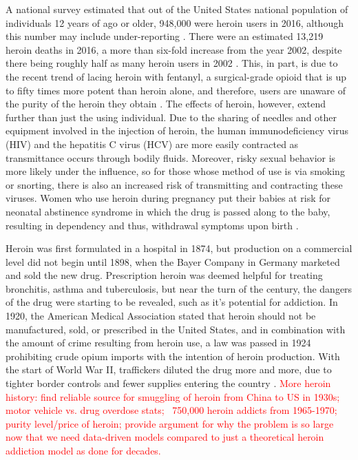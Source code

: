 \documentclass[12pt]{article}
\begin{document}
A national survey estimated that out of the United States national population of individuals 12 years of ago or older, 948,000 were heroin users in 2016, although this number may include under-reporting \cite{CDC2}. There were an estimated 13,219 heroin deaths in 2016, a more than six-fold increase from the year 2002, despite there being roughly half as many heroin users in 2002 \cite{NSDUH1}. This, in part, is due to the recent trend of lacing heroin with fentanyl, a surgical-grade opioid that is up to fifty times more potent than heroin alone, and therefore, users are unaware of the purity of the heroin they obtain \cite{CDC1, NIH2, Volkow2}. The effects of heroin, however, extend further than just the using individual. Due to the sharing of needles and other equipment involved in the injection of heroin, the human immunodeficiency virus (HIV) and the hepatitis C virus (HCV) are more easily contracted as transmittance occurs through bodily fluids. Moreover, risky sexual behavior is more likely under the influence, so for those whose method of use is via smoking or snorting, there is also an increased risk of transmitting and contracting these viruses. Women who use heroin during pregnancy put their babies at risk for neonatal abstinence syndrome in which the drug is passed along to the baby, resulting in dependency and thus, withdrawal symptoms upon birth \cite{NIDA2}. 

Heroin was first formulated in a hospital in 1874, but production on a commercial level did not begin until 1898, when the Bayer Company in Germany marketed and sold the new drug. Prescription heroin was deemed helpful for treating bronchitis, asthma and tuberculosis, but near the turn of the century, the dangers of the drug were starting to be revealed, such as it's potential for addiction. In 1920, the American Medical Association stated that heroin should not be manufactured, sold, or prescribed in the United States, and in combination with the amount of crime resulting from heroin use, a law was passed in 1924 prohibiting crude opium imports with the intention of heroin production. With the start of World War II, traffickers diluted the drug more and more, due to tighter border controls and fewer supplies entering the country \cite{UnitedNations}. \textcolor{red}{More heroin history: find reliable source for smuggling of heroin from China to US in 1930s; motor vehicle vs. drug overdose stats; ~750,000 heroin addicts from 1965-1970; purity level/price of heroin; provide argument for why the problem is so large now that we need data-driven models compared to just a theoretical heroin addiction model as done for decades.} 
\end{document}
